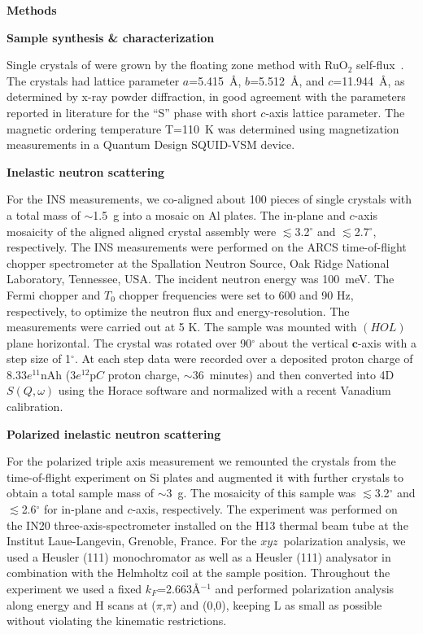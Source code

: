 
\vspace{20 pt}
\noindent
{\bf Methods}

\vspace{10 pt}
\noindent
{\bf Sample synthesis \& characterization}

\noindent
%
Single crystals of \CRO were grown by the floating zone method with RuO$_{2}$
self-flux~\cite{Nakatsuji97,Cao97}. The crystals had lattice parameter
$a$=5.415~\r{A}, $b$=5.512~\r{A}, and $c$=11.944~\r{A}, as determined by x-ray
powder diffraction, in good agreement with the parameters reported in
literature\cite{Braden_1998} for the ``S'' phase with short $c$-axis lattice parameter.
The magnetic ordering temperature T=110~K was determined using magnetization
measurements in a Quantum Design SQUID-VSM device.

\vspace{10 pt}
\noindent
{\bf Inelastic neutron scattering}

\noindent
%
For the INS measurements, we co-aligned about 100 pieces of single crystals
with a total mass of $\sim$1.5~g into a mosaic on Al plates. The in-plane and
$c$-axis mosaicity of the aligned aligned crystal assembly were
$\lesssim$3.2$^\circ$ and  $\lesssim$2.7$^\circ$, respectively. The INS
measurements were performed on the ARCS time-of-flight chopper spectrometer at
the Spallation Neutron Source, Oak Ridge National Laboratory, Tennessee, USA.
The incident neutron energy was 100~meV. The Fermi chopper and  $T_{0}$ chopper
frequencies were set to 600 and 90 Hz, respectively, to optimize the neutron
flux and energy-resolution. The measurements were carried out at 5 K. The
sample was mounted with $(HOL)$ plane horizontal. The crystal was rotated over
90$^\circ$  about the vertical $\mathbf{c}$-axis with a step size of 1$^\circ$.
At each step data were recorded over a deposited proton charge of $8.33
e^{11}$nAh ($3 e^{12}$p$C$ proton charge, $\sim 36$~minutes)
and then converted into 4D $S(Q,\omega)$ using the Horace software\cite{horace}
and normalized with a recent Vanadium calibration.

\vspace{10 pt}
\noindent
{\bf Polarized inelastic neutron scattering}

\noindent
%
For the polarized triple axis measurement we remounted the crystals from the
time-of-flight experiment on Si plates and augmented it with further crystals
to obtain a total sample mass of $\sim$3~g.
%
The mosaicity of this sample was $\lesssim$3.2$^\circ$ and 
$\lesssim$2.6$^\circ$ for in-plane and $c$-axis, respectively.
%
The experiment was performed on the IN20 three-axis-spectrometer installed on
the H13 thermal beam tube at the Institut Laue-Langevin, Grenoble, France. For
the $xyz$~polarization analysis, we used a Heusler (111) monochromator as well
as a Heusler (111) analysator in combination with the Helmholtz coil at the
sample position.
%
Throughout the experiment we used a fixed $k_F$=2.663\r{A}$^{-1}$ and performed
polarization analysis along energy and H scans at ($\pi$,$\pi$) and (0,0),
keeping L as small as possible without violating the kinematic restrictions.



